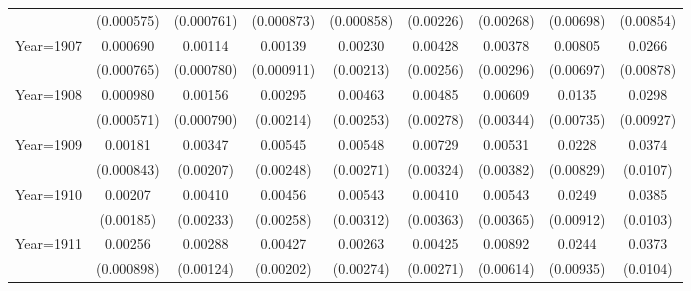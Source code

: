 \begin{table}[htbp]
\begin{tabular}{l*{8}{c}}
                    &  (0.000575)         &  (0.000761)         &  (0.000873)         &  (0.000858)         &   (0.00226)         &   (0.00268)         &   (0.00698)         &   (0.00854)         \\
[1em]
Year=1907           &    0.000690         &     0.00114         &     0.00139         &     0.00230         &     0.00428\sym{*}  &     0.00378         &     0.00805         &      0.0266\sym{***}\\
                    &  (0.000765)         &  (0.000780)         &  (0.000911)         &   (0.00213)         &   (0.00256)         &   (0.00296)         &   (0.00697)         &   (0.00878)         \\
[1em]
Year=1908           &    0.000980\sym{*}  &     0.00156\sym{**} &     0.00295         &     0.00463\sym{*}  &     0.00485\sym{*}  &     0.00609\sym{*}  &      0.0135\sym{*}  &      0.0298\sym{***}\\
                    &  (0.000571)         &  (0.000790)         &   (0.00214)         &   (0.00253)         &   (0.00278)         &   (0.00344)         &   (0.00735)         &   (0.00927)         \\
[1em]
Year=1909           &     0.00181\sym{**} &     0.00347\sym{*}  &     0.00545\sym{**} &     0.00548\sym{**} &     0.00729\sym{**} &     0.00531         &      0.0228\sym{***}&      0.0374\sym{***}\\
                    &  (0.000843)         &   (0.00207)         &   (0.00248)         &   (0.00271)         &   (0.00324)         &   (0.00382)         &   (0.00829)         &    (0.0107)         \\
[1em]
Year=1910           &     0.00207         &     0.00410\sym{*}  &     0.00456\sym{*}  &     0.00543\sym{*}  &     0.00410         &     0.00543         &      0.0249\sym{***}&      0.0385\sym{***}\\
                    &   (0.00185)         &   (0.00233)         &   (0.00258)         &   (0.00312)         &   (0.00363)         &   (0.00365)         &   (0.00912)         &    (0.0103)         \\
[1em]
Year=1911           &     0.00256\sym{***}&     0.00288\sym{**} &     0.00427\sym{**} &     0.00263         &     0.00425         &     0.00892         &      0.0244\sym{***}&      0.0373\sym{***}\\
                    &  (0.000898)         &   (0.00124)         &   (0.00202)         &   (0.00274)         &   (0.00271)         &   (0.00614)         &   (0.00935)         &    (0.0104)         \\

\end{tabular}
\end{table}
